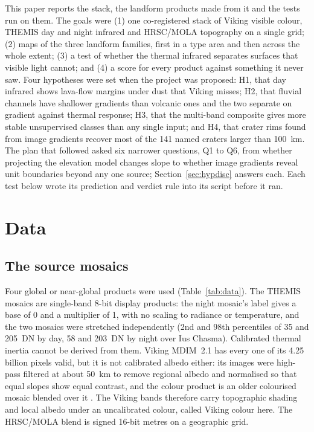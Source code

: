 \documentclass[twocolumn]{aastex701}
\begin{document}
This paper reports the stack, the landform products made from it and the tests run on them. The goals were (1) one
co-registered stack of Viking visible colour, THEMIS day and night infrared and HRSC/MOLA topography on a single grid;
(2) maps of the three landform families, first in a type area and then across the whole extent; (3) a test of whether
the thermal infrared separates surfaces that visible light cannot; and (4) a score for every product against
something it never saw. Four hypotheses were set when the project was proposed: H1, that day infrared shows
lava-flow margins under dust that Viking misses; H2, that fluvial channels have shallower gradients than volcanic ones
and the two separate on gradient against thermal response; H3, that the multi-band composite gives more stable
unsupervised classes than any single input; and H4, that crater rims found from image gradients recover most of the
141 named craters larger than 100~km. The plan that followed asked six narrower questions, Q1 to Q6, from whether
projecting the elevation model changes slope to whether image gradients reveal unit boundaries beyond any one source;
Section~\ref{sec:hypdisc} answers each. Each test below wrote its prediction and verdict rule into its script before it
ran. %

\section{Data} \label{sec:data}

\subsection{The source mosaics}

Four global or near-global products were used (Table~\ref{tab:data}). The THEMIS mosaics \citep{Christensen2004,
Edwards2011} are single-band 8-bit display products: the night mosaic's label gives a base of 0 and a multiplier of 1,
with no scaling to radiance or temperature, and the two mosaics were stretched independently (2nd and 98th percentiles
of 35 and 205~DN by day, 58 and 203~DN by night over Ius Chasma). Calibrated thermal inertia cannot be derived from
them. Viking MDIM~2.1 has every one of its 4.25 billion pixels valid, but it is not calibrated albedo either: its
images were high-pass filtered at about 50~km to remove regional albedo and normalised so that equal slopes show equal
contrast, and the colour product is an older colourised mosaic blended over it \citep{Archinal2003, USGS2009Viking}. The Viking bands therefore carry
topographic shading and local albedo under an uncalibrated colour, called Viking colour here. The HRSC/MOLA blend
\citep{Smith2001, Jaumann2007, Fergason2018} is signed 16-bit metres on a geographic grid. %
\end{document}
